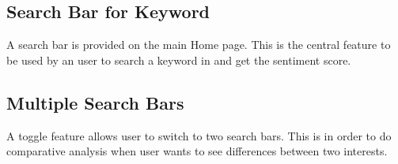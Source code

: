 \documentclass[12pt, titlepage]{article}
\begin{document}
\subsection {Search Bar for Keyword}
A search bar is provided on the main Home page. This is the central feature to be used by an user to search a keyword in and get the sentiment score.

\subsection {Multiple Search Bars}
A toggle feature allows user to switch to two search bars. This is in order to do comparative analysis when user wants to see differences between two interests.
\end{document}
